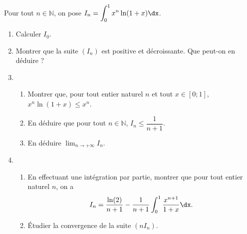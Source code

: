 \documentclass[11pt,fleqn, openany]{book} %
\begin{document}
\begin{exercise}Pour tout $n \in\mathbb{N}$, on pose $I_n=\displaystyle\int_0^1x^n \ln(1+x)\dx$.
\begin{enumerate}
\item Calculer $I_0$.
\item Montrer que la suite $(I_n)$ est positive et décroissante. Que peut-on en déduire ?
\item \begin{enumerate}
\item Montrer que, pour tout entier naturel $n$ et tout $x\in [0;1]$, $x^n \ln(1+x) \leqslant x^n$.
\item En déduire que pour tout $n \in \mathbb{N}$, $I_n \leqslant \dfrac{1}{n+1}$.
\item En déduire $\displaystyle\lim_{n \to+\infty}I_n$.
\end{enumerate}
\item \begin{enumerate}
\item En effectuant une intégration par partie, montrer que pour tout entier naturel $n$, on a
\[I_n = \dfrac{\ln(2)}{n+1}-\dfrac{1}{n+1}\int_0^1\dfrac{x^{n+1}}{1+x}\dx.\]
\item Étudier la convergence de la suite $(nI_n)$.
\end{enumerate}
\end{enumerate}\end{exercise}
\end{document}

